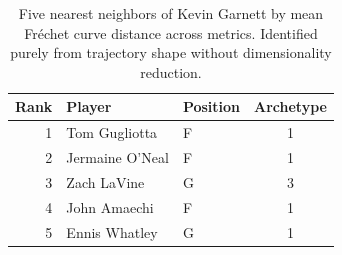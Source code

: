 \begin{table}[htbp]
  \centering\small
  \begin{tabular}{rllc}
    \toprule
    Rank & Player & Position & Archetype \\
    \midrule
    1 & Tom Gugliotta & F & 1 \\
    2 & Jermaine O'Neal & F & 1 \\
    3 & Zach LaVine & G & 3 \\
    4 & John Amaechi & F & 1 \\
    5 & Ennis Whatley & G & 1 \\
    \bottomrule
  \end{tabular}
  \caption{Five nearest neighbors of Kevin Garnett by mean Fr\'{e}chet curve distance across metrics. Identified purely from trajectory shape without dimensionality reduction.}
  \label{tab:Kevin_Garnett_frechet_curve_neighbors}
\end{table}

